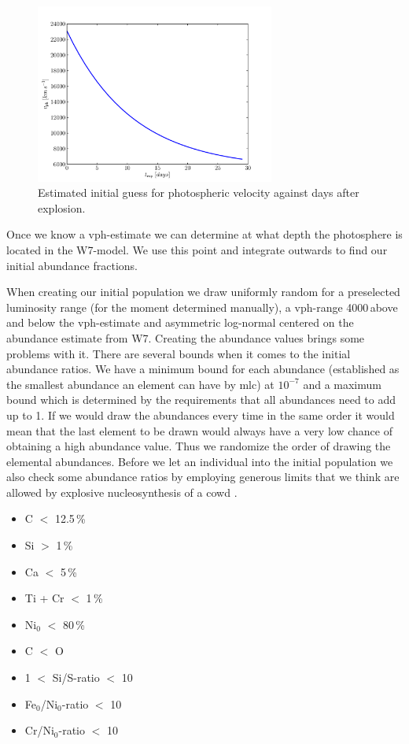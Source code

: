 \begin{figure}[htbp] %
   \centering
   \includegraphics[width=0.7\textwidth]{chapter_dalek/plots/plot_texp_vph.pdf} 
   \caption{Estimated initial guess for photospheric velocity against days after explosion. }
   \label{fig:Intrinsic }
\end{figure} 

Once we know a \gls{vph}-estimate we can determine at what depth the photosphere is located in the W7-model. We use this point and integrate outwards to find our initial abundance fractions.

When creating our initial population we draw uniformly random for a preselected luminosity range (for the moment determined manually), a \gls{vph}-range 4000\,\kms above and below the \gls{vph}-estimate and asymmetric log-normal centered on the abundance estimate from W7. Creating the abundance values brings some problems with it. There are several bounds when it comes to the initial abundance ratios. We have a minimum bound for each abundance (established as the smallest abundance an element can have by \gls{mlc}) at $10^{-7}$ and a maximum bound which is determined by the requirements that all abundances need to add up to 1. If we would draw the abundances every time in the same order it would mean that the last element to be drawn would always have a very low chance of obtaining a high abundance value. Thus we randomize the order of drawing the elemental abundances.  Before we let an individual into the initial population we also check some abundance ratios by employing generous limits that we think are allowed by explosive nucleosynthesis of a \gls{cowd} \citep[e.g.][]{1999ApJS..125..439I}. 

\begin{itemize}
\item C $<$ 12.5\,\%
\item Si $>$ 1\,\%
\item Ca $<$ 5\,\%
\item Ti + Cr $<$ 1\,\%
\item $\textrm{Ni}_0$ $<$ 80\,\%
\item C $<$ O
\item 1 $<$ Si/S-ratio $<$ 10
\item Fe$_0$/Ni$_0$-ratio $<$ 10
\item Cr/Ni$_0$-ratio $<$ 10
\end{itemize}

